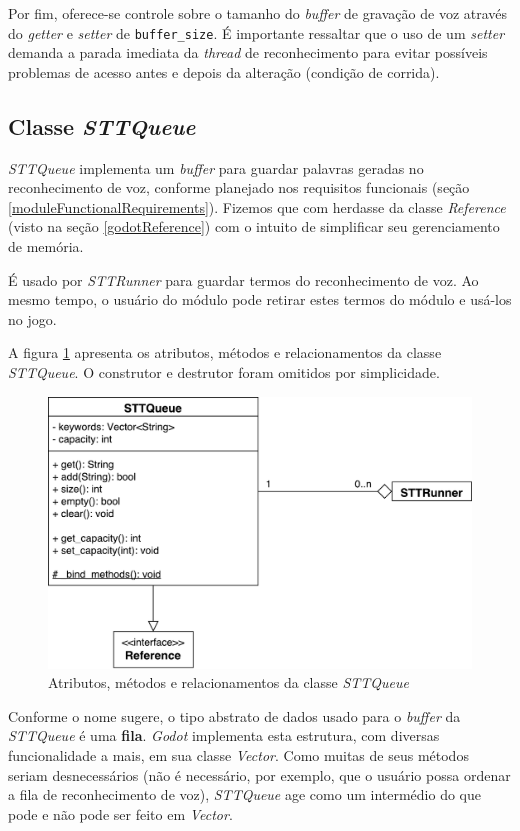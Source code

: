 Por fim, oferece-se controle sobre o tamanho do \textit{buffer} de gravação de voz através do \textit{getter} e \textit{setter} de \texttt{buffer\_size}. É importante ressaltar que o uso de um \textit{setter} demanda a parada imediata da \textit{thread} de reconhecimento para evitar possíveis problemas de acesso antes e depois da alteração (condição de corrida).


\subsection{Classe \textit{STTQueue}}

\textit{STTQueue} implementa um \textit{buffer} para guardar palavras geradas no reconhecimento de voz, conforme planejado nos requisitos funcionais (seção \ref{moduleFunctionalRequirements}). Fizemos que com herdasse da classe \textit{Reference} (visto na seção \ref{godotReference}) com o intuito de simplificar seu gerenciamento de memória.

É usado por \textit{STTRunner} para guardar termos do reconhecimento de voz. Ao mesmo tempo, o usuário do módulo pode retirar estes termos do módulo e usá-los no jogo.

A figura \ref{stt-queue-diagram} apresenta os atributos, métodos e relacionamentos da classe \textit{STTQueue}. O construtor e destrutor foram omitidos por simplicidade.

\begin{figure}[H]
  \centering
  \includegraphics[width=.8\textwidth]{image/stt-queue.pdf}
  \caption{Atributos, métodos e relacionamentos da classe \textit{STTQueue}}
  \label{stt-queue-diagram}
\end{figure}

Conforme o nome sugere, o tipo abstrato de dados usado para o \textit{buffer} da \textit{STTQueue} é uma \textbf{fila}. \textit{Godot} implementa esta estrutura, com diversas funcionalidade a mais, em sua classe \textit{Vector}. Como muitas de seus métodos seriam desnecessários (não é necessário, por exemplo, que o usuário possa ordenar a fila de reconhecimento de voz), \textit{STTQueue} age como um intermédio do que pode e não pode ser feito em \textit{Vector}.

